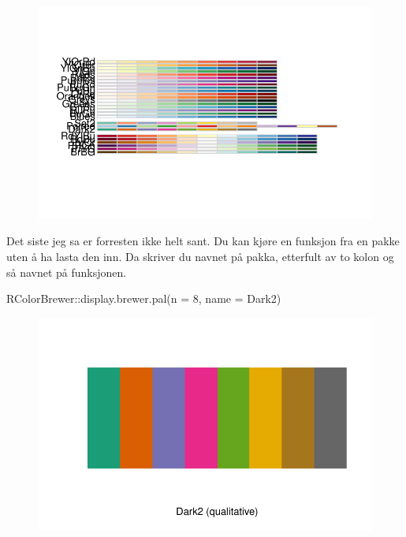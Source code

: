 \documentclass[
  letterpaper,
  DIV=11,
  numbers=noendperiod]{scrreprt}
\newenvironment{Shaded}{\begin{snugshade}}{\end{snugshade}}
\newcommand{\AttributeTok}[1]{\textcolor[rgb]{0.40,0.45,0.13}{#1}}
\newcommand{\DecValTok}[1]{\textcolor[rgb]{0.68,0.00,0.00}{#1}}
\newcommand{\FunctionTok}[1]{\textcolor[rgb]{0.28,0.35,0.67}{#1}}
\newcommand{\NormalTok}[1]{\textcolor[rgb]{0.00,0.23,0.31}{#1}}
\newcommand{\SpecialCharTok}[1]{\textcolor[rgb]{0.37,0.37,0.37}{#1}}
\newcommand{\StringTok}[1]{\textcolor[rgb]{0.13,0.47,0.30}{#1}}
\begin{document}
\begin{figure}[H]

{\centering \includegraphics{./pakker_files/figure-pdf/unnamed-chunk-4-1.pdf}

}

\end{figure}

Det siste jeg sa er forresten ikke helt sant. Du kan kjøre en funksjon
fra en pakke uten å ha lasta den inn. Da skriver du navnet på pakka,
etterfult av to kolon og så navnet på funksjonen.

\begin{Shaded}
\begin{Highlighting}[]
\NormalTok{RColorBrewer}\SpecialCharTok{::}\FunctionTok{display.brewer.pal}\NormalTok{(}\AttributeTok{n =} \DecValTok{8}\NormalTok{, }\AttributeTok{name =} \StringTok{\textquotesingle{}Dark2\textquotesingle{}}\NormalTok{)}
\end{Highlighting}
\end{Shaded}

\begin{figure}[H]

{\centering \includegraphics{./pakker_files/figure-pdf/unnamed-chunk-5-1.pdf}

}

\end{figure}
\end{document}
